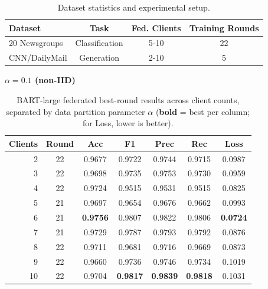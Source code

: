 \documentclass[conference]{IEEEtran}
\begin{document}
\begin{table}[H]
    \centering
    \caption{Dataset statistics and experimental setup.}
    \label{tab:dataset_stats}
    \begin{tabular}{lccc}
        \hline
        Dataset & Task & Fed. Clients & Training Rounds \\
        \hline
        20 Newsgroups & Classification & 5-10 & 22 \\
        CNN/DailyMail & Generation & 2-10 & 5 \\
        \hline
    \end{tabular}
\end{table}

\begin{table}[t]
    \centering
    \caption{BART-large federated best-round results across client counts, separated by data partition parameter $\alpha$ (\textbf{bold} = best per column; for Loss, lower is better).}
    \label{tab:fed_best_bart}
    {\small
    \begin{minipage}[t]{0.48\textwidth}
        \centering
        \textbf{$\alpha{=}0.1$ (non-IID)}\\[2pt]
        \begin{tabular}{rcccccc}
            \hline
            Clients & Round & Acc & F1 & Prec & Rec & Loss \\
            \hline
            2  & 22 & 0.9677 & 0.9722 & 0.9744 & 0.9715 & 0.0987 \\
            3  & 22 & 0.9698 & 0.9735 & 0.9753 & 0.9730 & 0.0959 \\
            4  & 22 & 0.9724 & 0.9515 & 0.9531 & 0.9515 & 0.0825 \\
            5  & 21 & 0.9697 & 0.9654 & 0.9676 & 0.9662 & 0.0993 \\
            6  & 21 & \textbf{0.9756} & 0.9807 & 0.9822 & 0.9806 & \textbf{0.0724} \\
            7  & 21 & 0.9729 & 0.9787 & 0.9793 & 0.9792 & 0.0876 \\
            8  & 22 & 0.9711 & 0.9681 & 0.9716 & 0.9669 & 0.0873 \\
            9  & 22 & 0.9660 & 0.9736 & 0.9746 & 0.9734 & 0.1019 \\
            10 & 22 & 0.9704 & \textbf{0.9817} & \textbf{0.9839} & \textbf{0.9818} & 0.1031 \\
            \hline
        \end{tabular}
    \end{minipage}\hfill
}
\end{table}
\end{document}
